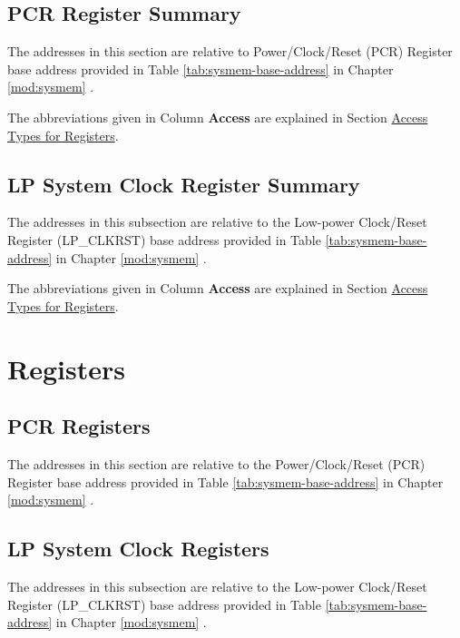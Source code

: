 \documentclass[main\_\_EN.tex]{subfiles}
\begin{document}
\subsection{PCR Register Summary}
\label{subsec:resclk-pcr-reg-summ}

The addresses in this section are relative to Power/Clock/Reset (PCR) Register base address provided in Table \ref{tab:sysmem-base-address} in Chapter \ref{mod:sysmem} \textit{}.

The abbreviations given in Column \textbf{Access} are explained in Section \hyperref[glossary-access-types]{Access Types for Registers}.



\subsection{LP System Clock Register Summary}
\label{subsec:resclk-lp-reg-summ}

The addresses in this subsection are relative to the Low-power Clock/Reset Register (LP\_CLKRST) base address provided in Table \ref{tab:sysmem-base-address} in Chapter \ref{mod:sysmem} \textit{}.

The abbreviations given in Column \textbf{Access} are explained in Section \hyperref[glossary-access-types]{Access Types for Registers}.






\newpage
\section{Registers}

\subsection{PCR Registers}


The addresses in this section are relative to the Power/Clock/Reset (PCR) Register base address provided in Table  \ref{tab:sysmem-base-address} in Chapter  \ref{mod:sysmem} \textit{}.





\subsection{LP System Clock Registers}


The addresses in this subsection are relative to the Low-power Clock/Reset Register (LP\_CLKRST) base address provided in Table \ref{tab:sysmem-base-address} in Chapter \ref{mod:sysmem} \textit{}.



\end{document}
